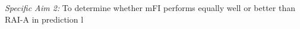 \emph{Specific Aim 2:} To determine whether mFI performs equally well or better than RAI-A in prediction l